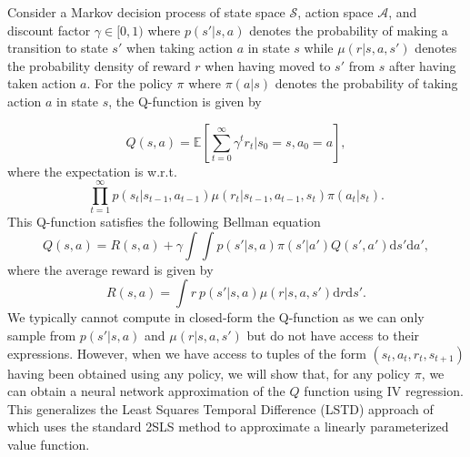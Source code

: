
Consider a Markov decision process of state space $\mathcal{S}$, action space $\mathcal{A}$, and discount factor $\gamma \in [0,1)$  where $p(s'|s,a)$ denotes the probability of making a transition to state $s'$ when taking action $a$ in state $s$ while $\mu(r|s,a,s')$ denotes the probability density of reward $r$ when having moved to $s'$ from $s$ after having taken action $a$. For the policy $\pi$ where $\pi(a|s)$ denotes the probability of taking action $a$ in state $s$, the Q-function is given by

\begin{equation}
    Q(s,a)=\mathbb{E}\left[\sum_{t=0}^\infty \gamma^t r_t | s_0=s, a_0=a\right],
\end{equation}
where the expectation is w.r.t.
\begin{equation}
    \prod_{t=1}^\infty p(s_t|s_{t-1},a_{t-1})\mu(r_{t}|s_{t-1},a_{t-1},s_{t})\pi(a_t|s_t).
\end{equation}
This Q-function satisfies the following Bellman equation
\begin{equation}\label{eq:BellmanQ}
    Q(s,a)=R(s,a)+\gamma \int\int p(s'|s,a)\pi(s'|a') Q(s',a')\textrm{d}s'\textrm{d}a',
\end{equation}
where the average reward is given by
\begin{equation}
    R(s,a)=\int r~p(s'|s,a)\mu(r|s,a,s') \textrm{d}r \textrm{d}s'.
\end{equation}
We typically cannot compute in closed-form the Q-function as we can only sample from $p(s'|s,a)$ and $\mu(r|s,a,s')$ but do not have access to their expressions. However, when we have access to tuples of the form $(s_t,a_t,r_t,s_{t+1})$ having been obtained using any policy, we will show that, for any policy $\pi$, we can obtain a neural network approximation of the $Q$ function using IV regression. This generalizes the Least Squares Temporal Difference (LSTD) approach of \cite{bradtke1996linear} which uses the standard 2SLS method to approximate a linearly parameterized value function.

